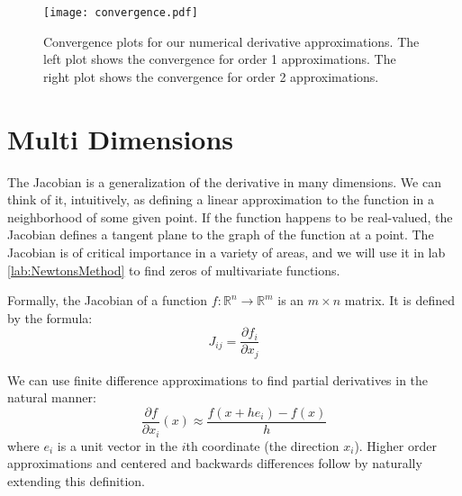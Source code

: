 \begin{figure}[t]
    \texttt{[image: convergence.pdf]}
    \caption{Convergence plots for our numerical derivative approximations.
    The left plot shows the convergence for order 1 approximations. 
    The right plot shows the convergence for order 2 approximations.}
    \label{fig:convergence}
\end{figure}

\section*{Multi Dimensions}

The Jacobian is a generalization of the derivative in many dimensions. We can think of it, 
intuitively, as defining a linear approximation to the function in a neighborhood of some given
point. If the function happens to be real-valued, the Jacobian defines a tangent plane to the graph of 
the function at a point. 
The Jacobian is of critical importance in a variety of areas, and we will use it in lab \ref{lab:NewtonsMethod}
to find zeros of multivariate functions.

Formally, the Jacobian of a function $f:\mathbb{R}^n \rightarrow \mathbb{R}^m$ is an $m \times n$ matrix. It is defined by the formula:
\begin{equation*}
J_{ij} = \frac{\partial f_i}{\partial x_j}
\end{equation*}

We can use finite difference approximations to find partial derivatives in the natural manner:
\begin{equation*}
\frac{\partial f}{\partial x_i} (x) \approx \frac{f(x+h e_i)-f(x)}{h}
\end{equation*}
where $e_i$ is a unit vector in the $i$th coordinate (the direction $x_i$). Higher order approximations and centered and backwards differences follow by naturally extending this definition.

